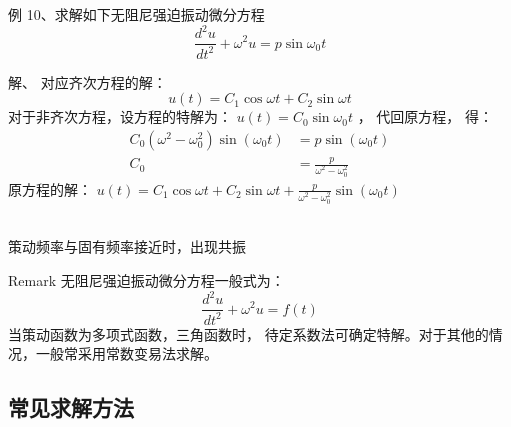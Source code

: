 \begin{frame}
	\begin{exampleblock} {例 10、求解如下无阻尼强迫振动微分方程}
	\begin{equation*}
		\frac{d^2 u}{d t^2} + \omega ^2 u = p  \sin \omega_0 t 
	\end{equation*}
	\end{exampleblock}
	\alert{解、} 
		对应齐次方程的解：\\
	\begin{equation*}
		u(t)=C_1 \cos \omega t +C_2 \sin \omega t 
	\end{equation*}
	对于非齐次方程，设方程的特解为：
	$ u(t) =C_0 \sin \omega_0 t $ ，
	代回原方程， 得：
	\begin{align*}
		C_0(\omega^2-\omega_{0} ^2 ) \sin(\omega_0 t)& =p\sin(\omega_0 t)\\
		C_0 & = \frac{p}{\omega^2-\omega_{0} ^2 }
	\end{align*}
	原方程的解： $ u(t)= C_1 \cos \omega t +C_2 \sin \omega t+ \frac{p}{\omega^2-\omega_{0} ^2 } \sin (\omega_0 t) $ \\
\end{frame}

\begin{frame}
	 \\
	策动频率与固有频率接近时，出现共振
\end{frame}

\begin{frame}
	\begin{block} {Remark}
	无阻尼强迫振动微分方程一般式为：
	\begin{equation*}
		\frac{d^2 u}{d t^2} + \omega ^2 u = f(t)
	\end{equation*}
	当策动函数为多项式函数，三角函数时， 待定系数法可确定特解。对于其他的情况，一般常采用常数变易法求解。
	\end{block}
\end{frame}

\subsection{常见求解方法}

